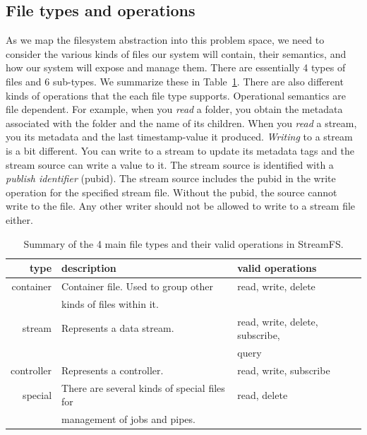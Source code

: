 \subsection{File types and operations}
As we map the filesystem abstraction into this problem space, we need to consider the various kinds of files our system will contain,
their semantics, and how our system will expose and manage them.  There are essentially 4 types of files and 6 sub-types.  We summarize
these in Table~\ref{tab:filetypes}.  There are also different kinds of operations that the each file type supports.  Operational semantics
are file dependent.  For example, when you \emph{read} a folder, you obtain the metadata associated with the folder and the name
of its children.  When you \emph{read} a stream, you its metadata and the last timestamp-value it produced.  \emph{Writing} to a stream
is a bit different.  You can write to a stream to update its metadata tags and the stream source can write a value to it.  The stream
source is identified with a \emph{publish identifier} (pubid).  The stream source includes the pubid in the write operation for 
the specified stream file.  Without the pubid, the source cannot write to the file.  Any other writer should not be allowed to write to 
a stream file either.  

\begin{table}[h]
\begin{center}
\begin{tabular}{| r | l | l |}
	\hline
	\textbf{type} & \textbf{description} & \textbf{valid operations} \\ \hline
	container & Container file.  Used to group other  & read, write, delete  \\
				   & kinds of files within it.  &  \\ \hline

	stream & Represents a data stream. & read, write, delete, subscribe, \\
			&							&query \\ \hline

	controller & Represents a controller. & read, write, subscribe \\ \hline

	special & There are several kinds of special files for  & read, delete \\
		    & management of jobs and pipes. &  \\ 
	\hline
\end{tabular}
\caption{Summary of the 4 main file types and their valid operations in StreamFS.}
\label{tab:filetypes}
\end{center}
\end{table}

